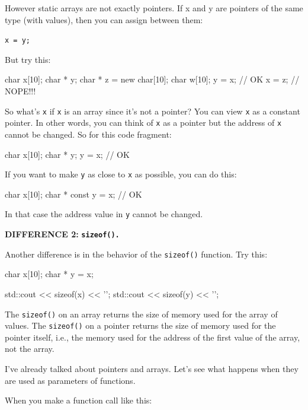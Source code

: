 However static arrays are not exactly pointers. If x and y are pointers
of the same type (with values), then you can assign between them:

\verb!x = y;!

But try this:

\begin{consolethree}[escapeinside=||]
char x[10];
char * y;
char * z = new char[10];
char w[10];
y = x; // OK
x = z; // NOPE!!!
\end{consolethree}

So what's \texttt{x} if \texttt{x} is an array since it's not a pointer? You
can view \texttt{x} as a constant pointer. In other words, you can think
of \texttt{x} as a pointer but the address of \texttt{x} cannot be changed.
So for this code fragment:

\begin{consolethree}[escapeinside=||]
char x[10];
char * y;
y = x; // OK
\end{consolethree}

If you want to make \texttt{y} as close to \texttt{x} as possible, you can
do this:

\begin{consolethree}[escapeinside=||]
char x[10];
char * const y = x; // OK
\end{consolethree}

In that case the address value in \texttt{y} cannot be changed.

\textbf{DIFFERENCE 2:} \texttt{\textbf{sizeof().}}

Another difference is in the behavior of the \texttt{sizeof()} function.
Try this:

\begin{consolethree}[escapeinside=||]
char x[10];
char * y = x;

std::cout << sizeof(x) << '\n';
std::cout << sizeof(y) << '\n';
\end{consolethree}

The \texttt{sizeof()} on an array returns the size of memory used for the
array of values. The \texttt{sizeof()} on a pointer returns the size of
memory used for the pointer itself, i.e., the memory used for the
address of the first value of the array, not the array.


\newpage{}

I've already talked about pointers and arrays. Let's see what happens
when they are used as parameters of functions.

When you make a function call like this:


